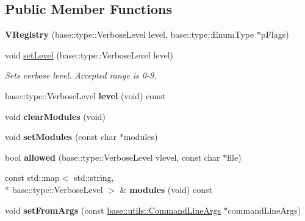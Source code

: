 \subsection*{Public Member Functions}
\begin{DoxyCompactItemize}
\item 
\hypertarget{classel_1_1base_1_1VRegistry_ac4b36d32d3722238024480ce66c52ad0}{{\bfseries V\-Registry} (base\-::type\-::\-Verbose\-Level level, base\-::type\-::\-Enum\-Type $\ast$p\-Flags)}\label{classel_1_1base_1_1VRegistry_ac4b36d32d3722238024480ce66c52ad0}

\item 
\hypertarget{classel_1_1base_1_1VRegistry_aea4fb84a03363080ee2501193084f71f}{void \hyperlink{classel_1_1base_1_1VRegistry_aea4fb84a03363080ee2501193084f71f}{set\-Level} (base\-::type\-::\-Verbose\-Level level)}\label{classel_1_1base_1_1VRegistry_aea4fb84a03363080ee2501193084f71f}

\begin{DoxyCompactList}\small\item\em Sets verbose level. Accepted range is 0-\/9. \end{DoxyCompactList}\item 
\hypertarget{classel_1_1base_1_1VRegistry_ad68e225738ecde9a5a59e9fcdfdcc1b9}{base\-::type\-::\-Verbose\-Level {\bfseries level} (void) const }\label{classel_1_1base_1_1VRegistry_ad68e225738ecde9a5a59e9fcdfdcc1b9}

\item 
\hypertarget{classel_1_1base_1_1VRegistry_a52de90db82e57827ac3d3994f70c17cf}{void {\bfseries clear\-Modules} (void)}\label{classel_1_1base_1_1VRegistry_a52de90db82e57827ac3d3994f70c17cf}

\item 
\hypertarget{classel_1_1base_1_1VRegistry_a65e202cc547cd11231d3ea0fb70765d0}{void {\bfseries set\-Modules} (const char $\ast$modules)}\label{classel_1_1base_1_1VRegistry_a65e202cc547cd11231d3ea0fb70765d0}

\item 
\hypertarget{classel_1_1base_1_1VRegistry_a13b725e3da8935fce5cf3c16fd3a2ff9}{bool {\bfseries allowed} (base\-::type\-::\-Verbose\-Level vlevel, const char $\ast$file)}\label{classel_1_1base_1_1VRegistry_a13b725e3da8935fce5cf3c16fd3a2ff9}

\item 
\hypertarget{classel_1_1base_1_1VRegistry_abc23bea6b9f2884caa6d5aadc8769892}{const std\-::map$<$ std\-::string, \\*
base\-::type\-::\-Verbose\-Level $>$ \& {\bfseries modules} (void) const }\label{classel_1_1base_1_1VRegistry_abc23bea6b9f2884caa6d5aadc8769892}

\item 
\hypertarget{classel_1_1base_1_1VRegistry_a811e62d7d016a0714b4363f47216a9da}{void {\bfseries set\-From\-Args} (const \hyperlink{classel_1_1base_1_1utils_1_1CommandLineArgs}{base\-::utils\-::\-Command\-Line\-Args} $\ast$command\-Line\-Args)}\label{classel_1_1base_1_1VRegistry_a811e62d7d016a0714b4363f47216a9da}

\end{DoxyCompactItemize}


